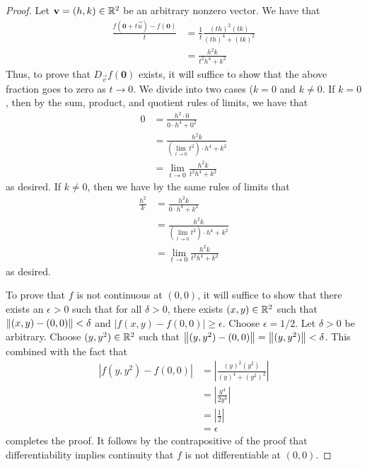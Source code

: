 \documentclass[../psets.tex]{subfiles}
\begin{document}
\begin{enumerate}
\begin{enumerate}
\begin{proof}
            Let $\mathbf{v}=(h,k)\in\mathbb{R}^2$ be an arbitrary nonzero vector. We have that
            \begin{align*}
                \frac{f(\bm{0}+t\vec{u})-f(\bm{0})}{t} &= \frac{1}{t}\frac{(th)^2(tk)}{(th)^4+(tk)^2}\\
                &= \frac{h^2k}{t^2h^4+k^2}
            \end{align*}
            Thus, to prove that $D_\vec{v}f(\bm{0})$ exists, it will suffice to show that the above fraction goes to zero as $t\to 0$. We divide into two cases ($k=0$ and $k\neq 0$. If $k=0$, then by the sum, product, and quotient rules of limits, we have that
            \begin{align*}
                0 &= \frac{h^2\cdot 0}{0\cdot h^4+0^2}\\
                &= \frac{h^2k}{(\lim_{t\to 0}t^2)\cdot h^4+k^2}\\
                &= \lim_{t\to 0}\frac{h^2k}{t^2h^4+k^2}
            \end{align*}
            as desired. If $k\neq 0$, then we have by the same rules of limits that
            \begin{align*}
                \frac{h^2}{k} &= \frac{h^2k}{0\cdot h^4+k^2}\\
                &= \frac{h^2k}{(\lim_{t\to 0}t^2)\cdot h^4+k^2}\\
                &= \lim_{t\to 0}\frac{h^2k}{t^2h^4+k^2}
            \end{align*}
            as desired.\par
            To prove that $f$ is not continuous at $(0,0)$, it will suffice to show that there exists an $\epsilon>0$ such that for all $\delta>0$, there exists $(x,y)\in\mathbb{R}^2$ such that $\norm{(x,y)-(0,0)}<\delta$ and $|f(x,y)-f(0,0)|\geq\epsilon$. Choose $\epsilon=1/2$. Let $\delta>0$ be arbitrary. Choose $(y,y^2)\in\mathbb{R}^2$ such that $\norm{(y,y^2)-(0,0)}=\norm{(y,y^2)}<\delta$. This combined with the fact that
            \begin{align*}
                |f(y,y^2)-f(0,0)| &= \left| \frac{(y)^2(y^2)}{(y)^4+(y^2)^2} \right|\\
                &= \left| \frac{y^4}{2y^4} \right|\\
                &= \left| \frac{1}{2} \right|\\
                &= \epsilon
            \end{align*}
            completes the proof. It follows by the contrapositive of the proof that differentiability implies continuity that $f$ is not differentiable at $(0,0)$.

\end{proof}
\end{enumerate}
\end{enumerate}
\end{document}
